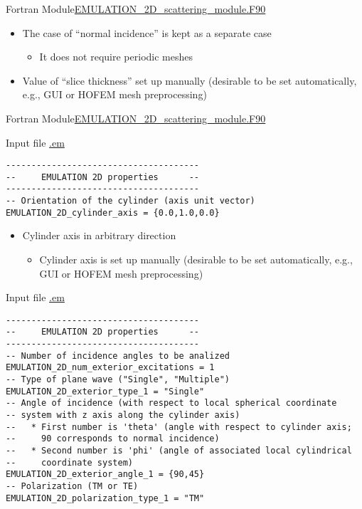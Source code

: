 \begin{frame}{Fortran Module}{\url{EMULATION_2D_scattering_module.F90}}
   \begin{itemize}
   \item The case of ``normal incidence'' is kept as a separate case
     \begin{itemize}
     \item It does not require periodic meshes
     \end{itemize}
   \item Value of ``slice thickness'' set up manually (desirable to be
     set automatically, e.g., GUI or HOFEM mesh preprocessing)
   \end{itemize}
   
  \end{frame}
  
  
  \begin{frame}{Fortran Module}{\url{EMULATION_2D_scattering_module.F90} }

    \begin{block}{Input file \url{.em}} 
      \begin{lstlisting}[basicstyle=\ttfamily\footnotesize,tabsize=3,frame=none]
--------------------------------------
--     EMULATION 2D properties      --
--------------------------------------
-- Orientation of the cylinder (axis unit vector)
EMULATION_2D_cylinder_axis = {0.0,1.0,0.0}
     \end{lstlisting}
   \end{block}


   \begin{itemize}
   \item Cylinder axis in arbitrary direction
     \begin{itemize}
     \item Cylinder axis is set up manually (desirable to be set
       automatically, e.g., GUI or HOFEM mesh preprocessing)
     \end{itemize}
   \end{itemize}     

   
   \framebreak %
    \begin{block}{Input file \url{.em}} 
      \begin{lstlisting}[basicstyle=\ttfamily\footnotesize,tabsize=3,frame=none]
--------------------------------------
--     EMULATION 2D properties      --
--------------------------------------
-- Number of incidence angles to be analized
EMULATION_2D_num_exterior_excitations = 1
-- Type of plane wave ("Single", "Multiple")
EMULATION_2D_exterior_type_1 = "Single"
-- Angle of incidence (with respect to local spherical coordinate
-- system with z axis along the cylinder axis)
--   * First number is 'theta' (angle with respect to cylinder axis;
--     90 corresponds to normal incidence)
--   * Second number is 'phi' (angle of associated local cylindrical
--     coordinate system)
EMULATION_2D_exterior_angle_1 = {90,45}
-- Polarization (TM or TE)
EMULATION_2D_polarization_type_1 = "TM"
     \end{lstlisting}
   \end{block}


\end{frame}
